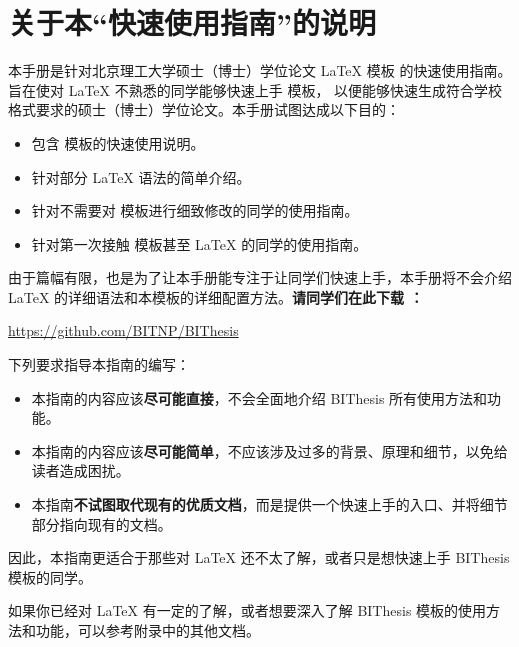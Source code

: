 \chapter*{关于本“快速使用指南”的说明}

本手册是针对北京理工大学硕士（博士）学位论文 \LaTeX{} 模板 \BIThesis{} 的快速使用指南。
旨在使对 \LaTeX{} 不熟悉的同学能够快速上手 \BIThesis{} 模板，
以便能够快速生成符合学校格式要求的硕士（博士）学位论文。本手册试图达成以下目的：
\begin{itemize}[noitemsep]
  \item 包含 \BIThesis{} 模板的快速使用说明。
  \item 针对部分 \LaTeX{} 语法的简单介绍。
  \item 针对不需要对 \BIThesis{} 模板进行细致修改的同学的使用指南。
  \item 针对第一次接触 \BIThesis{} 模板甚至 \LaTeX{} 的同学的使用指南。
\end{itemize}

由于篇幅有限，也是为了让本手册能专注于让同学们快速上手，本手册将不会介绍
\LaTeX{} 的详细语法和本模板的详细配置方法。\textbf{请同学们在此下载 \BIThesis{}：}
\begin{center}
  \url{https://github.com/BITNP/BIThesis}
\end{center}

下列要求指导本指南的编写：

\begin{itemize}
  \item 本指南的内容应该\textbf{尽可能直接}，不会全面地介绍 BIThesis 所有使用方法和功能。
  \item 本指南的内容应该\textbf{尽可能简单}，不应该涉及过多的背景、原理和细节，以免给读者造成困扰。
  \item 本指南\textbf{不试图取代现有的优质文档}，而是提供一个快速上手的入口、并将细节部分指向现有的文档。
\end{itemize}

因此，本指南更适合于那些对 \LaTeX{} 还不太了解，或者只是想快速上手 BIThesis 模板的同学。

如果你已经对 \LaTeX{} 有一定的了解，或者想要深入了解 BIThesis 模板的使用方法和功能，可以参考附录中的其他文档。
